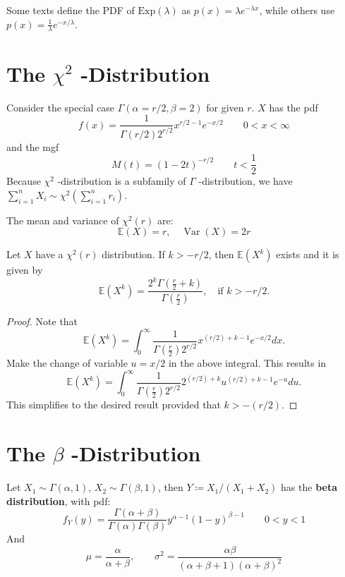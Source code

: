 \begin{remark}
Some texts define the PDF of $\text{Exp}(\lambda)$ as $p(x)=\lambda e^{-\lambda x}$, while others use $p(x)=\frac{1}{\lambda} e^{-x/\lambda}$.
\end{remark}
\section{The \texorpdfstring{$\chi^{2}$}{chi^2} -Distribution}

Consider the special case $\Gamma(\alpha=r/2,\beta=2)$ for given $r$. $X$ has the pdf
\[
f(x)=\frac{1}{\Gamma(r/2 )2^{r/2 }}x^{r/2-1}e^{ -x/2  }\qquad 0<x<\infty
\]
and the mgf
\[
M(t)=(1-2t)^{-r/2 }\qquad t<\frac{1}{2}
\]
Because $\chi^{2}$ -distribution is a subfamily of $\Gamma$ -distribution, we have $\sum_{i=1}^{n}X_i\sim \chi^{2}\left( \sum_{i=1}^{n}r_i \right)$.

The mean and variance of $\chi^2(r)$ are:
\[
\mathbb{E}(X) = r, \quad \operatorname{Var}(X) = 2r
\]
\begin{theorem}
Let $X$ have a $\chi^2(r)$ distribution. If $k > -r/2$, then $\mathbb{E}(X^k)$ exists and it is given by
\begin{equation}
\mathbb{E}(X^k) = \frac{2^k\Gamma\left(\frac{r}{2} + k\right)}{\Gamma\left(\frac{r}{2}\right)}, \quad \text{if } k > -r/2.
\label{ea9b9f}
\end{equation}
\end{theorem}

\begin{proof}
Note that
\[
\mathbb{E}(X^k) = \int_0^\infty \frac{1}{\Gamma\left(\frac{r}{2}\right)2^{r/2}}x^{(r/2)+k-1}e^{-x/2}dx.
\]
Make the change of variable $u = x/2$ in the above integral. This results in
\[
\mathbb{E}(X^k) = \int_0^\infty \frac{1}{\Gamma\left(\frac{r}{2}\right)2^{r/2}}2^{(r/2)+k}u^{(r/2)+k-1}e^{-u}du.
\]
This simplifies to the desired result provided that $k > -(r/2)$.
\end{proof}

\section{The \texorpdfstring{$\beta$}{beta} -Distribution}

Let $X_1\sim\Gamma(\alpha,1)$, $X_2\sim\Gamma(\beta,1)$, then $Y\coloneqq X_1/(X_1+X_2)$ has the \textbf{beta distribution}, with pdf:
\[
f_{Y}(y)=\frac{\Gamma(\alpha+\beta)}{\Gamma(\alpha)\Gamma(\beta)}y^{\alpha-1}(1-y)^{\beta-1}\qquad 0<y<1
\]
And
\[
\mu=\frac{\alpha}{\alpha+\beta},\qquad \sigma^{2}=\frac{\alpha\beta}{(\alpha+\beta+1)(\alpha+\beta)^2}
\]
